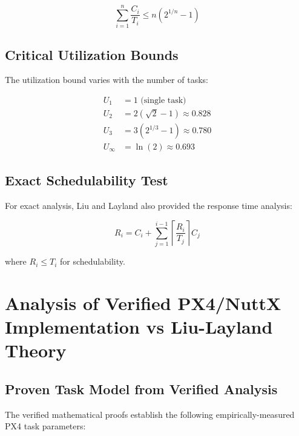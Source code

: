 \documentclass[12pt,a4paper]{article}
\begin{document}
\begin{equation}
\sum_{i=1}^{n} \frac{C_i}{T_i} \leq n(2^{1/n} - 1)
\end{equation}

\subsection{Critical Utilization Bounds}

The utilization bound varies with the number of tasks:

\begin{align}
U_1 &= 1 \text{ (single task)} \\
U_2 &= 2(\sqrt{2} - 1) \approx 0.828 \\
U_3 &= 3(2^{1/3} - 1) \approx 0.780 \\
U_{\infty} &= \ln(2) \approx 0.693
\end{align}

\subsection{Exact Schedulability Test}

For exact analysis, Liu and Layland also provided the response time analysis:

\begin{equation}
R_i = C_i + \sum_{j=1}^{i-1} \left\lceil \frac{R_i}{T_j} \right\rceil C_j
\end{equation}

where $R_i \leq T_i$ for schedulability.

\section{Analysis of Verified PX4/NuttX Implementation vs Liu-Layland Theory}

\subsection{Proven Task Model from Verified Analysis}

The verified mathematical proofs establish the following empirically-measured PX4 task parameters:
\end{document}

